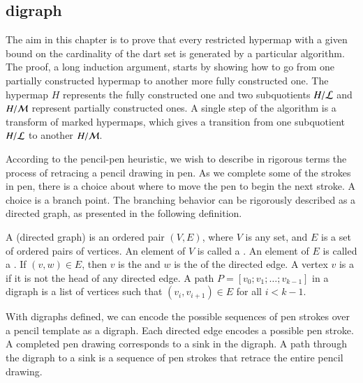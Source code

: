 \subsection{digraph}

The aim in this chapter is to prove that every restricted hypermap with a given bound
on the cardinality of the dart set is generated by a particular algorithm.
The proof, a long induction argument,   starts by showing
how to go from one partially constructed hypermap to another more
fully constructed one.  The hypermap $H$ represents the fully
constructed one and two subquotients $H/{\cal L}$ and $H/{\cal M}$
represent partially constructed ones. 
A single step of the algorithm is a transform of marked hypermaps, which gives
a transition from one subquotient $H/{\cal L}$ to another $H/{\cal M}$.
%

According to the pencil-pen heuristic, we wish to describe in rigorous
terms the process of retracing a pencil drawing in pen.  As we
complete some of the strokes in pen, there is a choice about where to
move the pen to begin the next stroke.  A choice is a branch point.
The branching behavior can be rigorously described as a directed
graph, as presented in the following definition.


\begin{definition}
  A  (directed graph) is an ordered pair $(V,E)$,
  where $V$ is any set, and $E$ is a set of ordered pairs of vertices.
  An element of $V$ is called a .  An element of $E$
  is called a .  If $(v,w)\in E$, then $v$ is
  the  and $w$ is the  of the directed
  edge.  A vertex $v$ is a  if it is not the head of any
  directed edge.  A path $P=[v_0;v_1;\ldots;v_{k-1}]$ in a digraph is
  a list of vertices such that $(v_i,v_{i+1})\in E$ for all $i<k-1$.
\end{definition}

With digraphs defined, we can encode the possible sequences of pen strokes over
a pencil template as a digraph.  Each directed edge encodes a
possible pen stroke.  A completed pen drawing corresponds to a sink in the digraph.
A path through the digraph to a sink is a sequence of pen strokes that retrace 
the entire pencil drawing.

